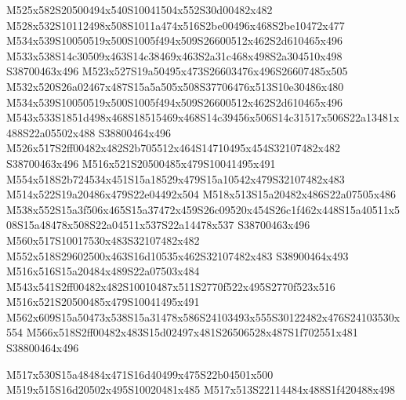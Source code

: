 \documentclass{article}
\begin{document}
\begin{multicols}{2}

M525x582S20500494x540S10041504x552S30d00482x482 M528x532S10112498x508S1011a474x516S2be00496x468S2be10472x477 M534x539S10050519x500S1005f494x509S26600512x462S2d610465x496 M533x538S14c30509x463S14c38469x463S2a31c468x498S2a304510x498 S38700463x496 M523x527S19a50495x473S26603476x496S26607485x505 M532x520S26a02467x487S15a5a505x508S37706476x513S10e30486x480 M534x539S10050519x500S1005f494x509S26600512x462S2d610465x496 M543x533S1851d498x468S18515469x468S14c39456x506S14c31517x506S22a13481x488S22a05502x488 S38800464x496 M526x517S2ff00482x482S2b705512x464S14710495x454S32107482x482 S38700463x496 M516x521S20500485x479S10041495x491 M554x518S2b724534x451S15a18529x479S15a10542x479S32107482x483 M514x522S19a20486x479S22e04492x504 M518x513S15a20482x486S22a07505x486 M538x552S15a3f506x465S15a37472x459S26c09520x454S26c1f462x448S15a40511x508S15a48478x508S22a04511x537S22a14478x537 S38700463x496 M560x517S10017530x483S32107482x482 M552x518S29602500x463S16d10535x462S32107482x483 S38900464x493 M516x516S15a20484x489S22a07503x484 M543x541S2ff00482x482S10010487x511S2770f522x495S2770f523x516 M516x521S20500485x479S10041495x491 M562x609S15a50473x538S15a31478x586S24103493x555S30122482x476S24103530x554 M566x518S2ff00482x483S15d02497x481S26506528x487S1f702551x481 S38800464x496

\begin{center}
M517x530S15a48484x471S16d40499x475S22b04501x500 M519x515S16d20502x495S10020481x485 M517x513S22114484x488S1f420488x498 
\end{center}










\end{multicols}
\end{document}

